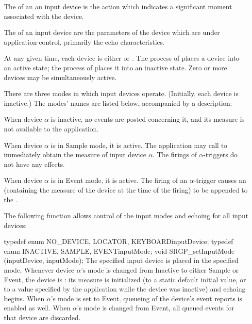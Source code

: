 \newpar
The  of an an input device is the action which indicates
a significant moment associated with the device.

\newpar
The  of an input device are the parameters of the
device which are under application-control, primarily the echo
characteristics.

\newpar
At any given time, each device is either  or
.  The process of  places a device
into an active state; the process of  places it into an
inactive state.  Zero or more devices may be simultaneously active.






There are three modes in which input devices operate.  (Initially, each device
is inactive.) The modes' names are listed below, accompanied by a
description:


When device $\alpha$ is inactive, no events are posted concerning it,
and its measure is not available to the application.

When device $\alpha$ is in Sample mode, it is active.  The application may call
 to immediately obtain the measure of input
device $\alpha$.  The firings of $\alpha$-triggers do not have any
effects.

When device $\alpha$ is in Event mode, it is active.
The firing of an $\alpha$-trigger
causes an  (containing the measure of the device at
the time of the firing) to be appended to the .

\newpar
The following function allows control of the input
modes and echoing for all input devices:

\newsynopsis
typedef enum \lb{}NO_DEVICE, LOCATOR, KEYBOARD\rb inputDevice;
typedef enum \lb{}INACTIVE, SAMPLE, EVENT\rb inputMode;
void SRGP_setInputMode (inputDevice, inputMode);
\endsynopsis
The specified input device is placed in the specified mode.  Whenever device
$\alpha$'s mode is changed from Inactive to either Sample or Event, the device
is : its measure is initialized (to a static default initial
value, or to a value specified by the application while the device was
inactive) and echoing begins.  When $\alpha$'s mode is set to Event, queueing
of the device's event reports is enabled as well.  When $\alpha$'s mode is
changed from Event, all queued events for that device are discarded.

